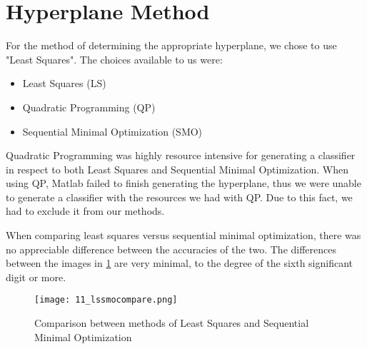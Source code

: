 \section{Hyperplane Method}

For the method of determining the appropriate hyperplane, we chose to use "Least Squares". The choices available to us were:

\begin{itemize}
  \item Least Squares (LS)
  \item Quadratic Programming (QP)
  \item Sequential Minimal Optimization (SMO)
\end{itemize}

Quadratic Programming was highly resource intensive for generating a classifier in respect to both Least Squares and Sequential Minimal Optimization. When using QP, Matlab failed to finish generating the hyperplane, thus we were unable to generate a classifier with the resources we had with QP. Due to this fact, we had to exclude it from our methods.

When comparing least squares versus sequential minimal optimization, there was no appreciable difference between the accuracies of the two. The differences between the images in \ref{fig:11_lssmocompare} are very minimal, to the degree of the sixth significant digit or more.

\begin{figure}[ht]
    \centering
    \texttt{[image: 11\_lssmocompare.png]}
    \caption{Comparison between methods of Least Squares and Sequential Minimal Optimization}
    \label{fig:11_lssmocompare}
\end{figure}


